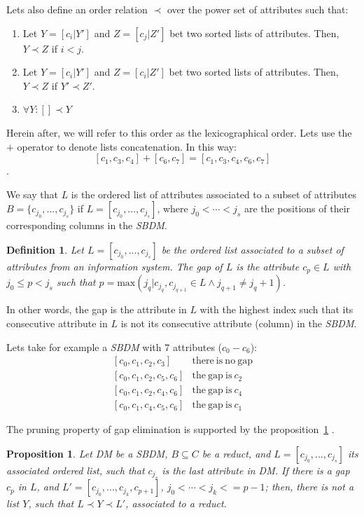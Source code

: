 \documentclass[number,preprint,review,12pt]{elsarticle}
\newtheorem{proposition}{Proposition}
\newtheorem{definition}{Definition}
\begin{document}
	Lets also define an order relation $\prec$ over the power set of attributes such that:
	\begin{enumerate}
		\item Let $Y=[c_i|Y']$ and $Z=[c_j|Z']$ bet two sorted lists of attributes. Then, $Y \prec Z$ if $i<j$.
		\item Let $Y=[c_i|Y']$ and $Z=[c_i|Z']$ bet two sorted lists of attributes. Then, $Y \prec Z$ if $Y' \prec Z'$.
		\item $\forall Y:  [] \prec Y$
	\end{enumerate}
	Herein after, we will refer to this order as the lexicographical order. Lets use the $+$ operator to denote lists concatenation. In this way: $$[c_1,c_3,c_4]+[c_6,c_7]=[c_1,c_3,c_4,c_6,c_7]$$.
		
	We say that $L$ is the ordered list of attributes associated to a subset of attributes $B = \lbrace c_{j_0},...,c_{j_s} \rbrace$ if $L = [c_{j_0},...,c_{j_s}]$, where $j_0<\cdots <j_s$ are the positions of their corresponding columns in the \textit{SBDM}.
	
	\begin{definition}\label{def:gap}
		Let $L = [c_{j_0},...,c_{j_s}]$ be the ordered list associated to a subset of attributes from an information system. The gap of $L$ is the attribute $c_p \in L$ with $j_0 \leq p <	j_s$ such that $p=\mathrm{max}(j_q | c_{j_q},c_{j_{q+1}} \in L \wedge j_{q+1} \neq j_q+1)$.
	\end{definition}
	
	In other words, the gap is the attribute in $L$ with the highest index such that its consecutive attribute in $L$ is not its consecutive attribute (column) in the \textit{SBDM}.
	
	Lets take for example a \textit{SBDM} with 7 attributes ($c_0 - c_6$):
	$$\begin{array}{ll}
	{[c_0,c_1,c_2,c_3]} 		& \mathrm{there~is~no~gap}\\
	{[c_0,c_1,c_2,c_5,c_6]} 	& \mathrm{the~gap~is~} c_2\\
	{[c_0,c_1,c_2,c_4,c_6]} 	& \mathrm{the~gap~is~} c_4\\
	{[c_0,c_1,c_4,c_5,c_6]} 	& \mathrm{the~gap~is~} c_1
	\end{array}$$


	The pruning property of gap elimination is supported by the proposition~\ref{prop:gap} \citep{Santiesteban03}. 
		
	\begin{proposition}\label{prop:gap} 
		Let DM be a SBDM, $B \subseteq C$ be a reduct, and $L = [c_{j_0},...,c_{j_s}]$ its associated ordered list, such that $c_{j_s}$ is the last attribute in DM. If there is a gap $c_p$ in $L$, and $L' = [c_{j_0},...,c_{j_k},c_{p+1}]$, $j_0<\cdots <j_k<=p-1$; then, there is not a list $Y$, such that $L \prec Y \prec L'$, associated to a reduct.
	\end{proposition}	
	
\end{document}
